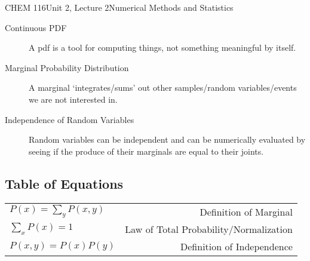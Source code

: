\documentclass{article}
\begin{document}
\begin{tdoc}{CHEM 116}{Unit 2, Lecture 2}{Numerical Methods and Statistics}
\begin{description}
\item[Continuous PDF] A pdf is a tool for computing things, not
  something meaningful by itself.

\item[Marginal Probability Distribution] A marginal `integrates/sums'
  out other samples/random variables/events we are not interested in.

  \item[Independence of Random Variables] Random variables can be independent and can
  be numerically evaluated by seeing if the produce of their marginals are equal to their
  joints.


\end{description}


\subsection{Table of Equations}

  \begin{tabular}{lr}
    $P(x) = \sum_y P(x,y)$ & Definition of Marginal\vspace{0.15cm}\\
    $\sum_x P(x) = 1$ & Law of Total Probability/Normalization\vspace{0.15cm}\\
    $P(x,y) = P(x)P(y)$ & Definition of Independence\vspace{0.15cm}\\
  \end{tabular}

\end{tdoc}
\end{document}
